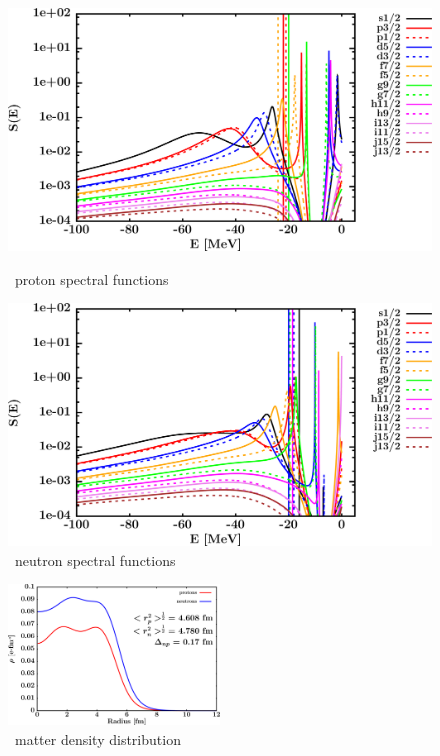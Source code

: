 \begin{figure}[H]
    \centering
    \begin{minipage}{0.45\textwidth}
        \centering
        \includegraphics[width=1.0\textwidth]{figures/sn124_protonSpectralFunctions.png}
        \caption{\snFour\ proton spectral functions}
        \label{DOMFitData_sn124_proton_spectralFunctions}
    \end{minipage}\hfill
    \begin{minipage}{0.45\textwidth}
        \centering
        \includegraphics[width=1.0\textwidth]{figures/sn124_neutronSpectralFunctions.png}
        \caption{\snFour\ neutron spectral functions}
        \label{DOMFitData_sn124_neutron_spectralFunctions}
    \end{minipage}
\end{figure}

\begin{figure}[H]
    \centering
    \includegraphics[width = 0.5\textwidth]{figures/sn124_matterDensity.png}
    \caption{\snFour\ matter density distribution}
    \label{DOMFitData_sn124_matterDensity}
\end{figure}

